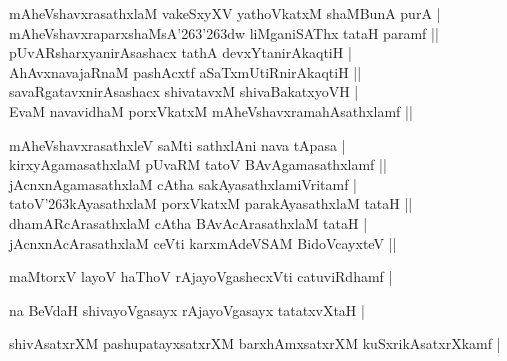 \begin{entry}
\medskip
\begin{shl}
mAheVshavxrasathxlaM vakeSxyXV yathoVkatxM shaMBunA purA |\\[2pt]
mAheVshavxraparxshaMsA{\char'263\char'263}dw liMganiSAThx tataH paramf ||\\[2pt]
pUvARsharxyanirAsashacx tathA devxYtanirAkaqtiH |\\[2pt]
AhAvxnavajaRnaM pashAcxtf aSaTxmUtiRnirAkaqtiH ||\\[2pt]
savaRgatavxnirAsashacx shivatavxM shivaBakatxyoVH |\\[2pt]
EvaM navavidhaM porxVkatxM mAheVshavxramahAsathxlamf ||\\[-1pt]
\end{shl}
\medskip
{}
\medskip
\begin{shl}
mAheVshavxrasathxleV saMti sathxlAni nava tApasa |\\[2pt]
kirxyAgamasathxlaM pUvaRM tatoV BAvAgamasathxlamf ||\\[2pt]
jAcnxnAgamasathxlaM cAtha sakAyasathxlamiVritamf |\\[2pt]
tatoV{\char'263}kAyasathxlaM porxVkatxM parakAyasathxlaM tataH ||\\[2pt]
dhamARcArasathxlaM cAtha BAvAcArasathxlaM tataH |\\[2pt]
jAcnxnAcArasathxlaM ceVti karxmAdeVSAM BidoVcayxteV ||\\[-1pt]
\end{shl}
\medskip
{}
\medskip
{}
\medskip
\begin{shl}
maMtorxV layoV haThoV rAjayoVgashecxVti catuviRdhamf |\\[-1pt]
\end{shl}
\medskip
{}
\medskip
{}
\medskip
\begin{shl}
na BeVdaH shivayoVgasayx rAjayoVgasayx tatatxvXtaH |\\[-1pt]
\end{shl}
\medskip
{}
\medskip
{}
\medskip
\begin{shl}
shivAsatxrXM pashupatayxsatxrXM barxhAmxsatxrXM kuSxrikAsatxrXkamf |\\[2pt]

\end{shl}
\end{entry}
